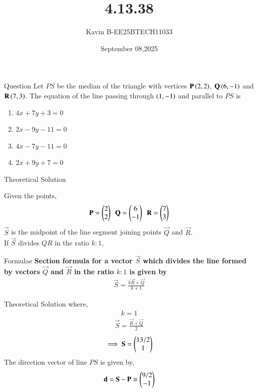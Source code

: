 \documentclass{beamer}
\begin{document}
\title 
{4.13.38}
\date{September 08,2025}


\author 
{Kavin B-EE25BTECH11033}






\frame{\titlepage}
\begin{frame}{Question}
Let $PS$ be the median of the triangle with vertices $\mathbf{P}\left(2, 2\right)$, $\mathbf{Q}\left(6, -1\right)$ and $\mathbf{R}\left(7,3\right)$. The equation of the line passing through $\left(1, -1\right)$ and parallel to $PS$ is 
\begin{multicols}{2}
\begin{enumerate}
\item $4x+7y+3=0$
\item $2x-9y-11=0$
\item $4x-7y-11=0$
\item $2x+9y+7=0$
\end{enumerate}
\end{multicols}
\end{frame}



\begin{frame}{Theoretical Solution}

Given the points,\\
\begin{align}
\mathbf{P}=\begin{pmatrix}2\\2\end{pmatrix}\ \ \mathbf{Q}=\begin{pmatrix}6\\-1\end{pmatrix}\ \ \mathbf{R}=\begin{pmatrix}7\\3\end{pmatrix}
\end{align}
$\vec{S}$ is the midpoint of the line segment joining points $\vec{Q}$ and $\vec{R}$.\\
If $\vec{S}$ divides $QR$ in the ratio $k : 1$,
\end{frame}

\begin{frame}{Formulae}
\textbf{Section formula for a vector $\vec{S}$ which divides the line formed by vectors $\vec{Q}$ and $\vec{R}$ in the ratio $k:1$ is given by}
\begin{align}
    \vec{S}=\frac{k\vec{R}+\vec{Q}}{k+1}
\end{align}
\end{frame}

\begin{frame}{Theoretical Solution}
where,
\begin{align}
    k=1
\end{align}
\begin{align}
    \vec{S}= \frac{\vec{R}+\vec{Q}}{2}
\end{align}
\begin{align}
    \implies\mathbf{S}= \begin{pmatrix}13/2\\1\end{pmatrix}
\end{align}
The direction vector of line $PS$ is given by,
\begin{align}
\mathbf{d}=\mathbf{S}-\mathbf{P} \equiv \begin{pmatrix}9/2\\-1\end{pmatrix}
\end{align}
\end{frame}
\end{document}
